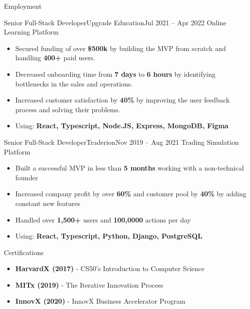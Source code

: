 \documentclass[]{mcdowellcv}
\begin{document}
\begin{cvsection}{Employment}
		\begin{cvsubsection}{Senior Full-Stack Developer}{Upgrade Education}{Jul 2021 -- Apr 2022}
			Online Learning Platform
			\begin{itemize}
				\item Secured funding of over \textbf{\$500k} by building the MVP from scratch and handling \textbf{400+} paid users.
				\item Decreased onboarding time from \textbf{7 days} to \textbf{6 hours} by identifying bottlenecks in the sales and operations.
				\item Increased customer satisfaction by \textbf{40\%} by improving the user feedback process and solving their problems.
				\item Using: \textbf{React, Typescript, Node.JS, Express, MongoDB, Figma}
			\end{itemize}
		\end{cvsubsection}

		\begin{cvsubsection}{Senior Full-Stack Developer}{Traderion}{Nov 2019 -- Aug 2021}
			Trading Simulation Platform
			\begin{itemize}
				\item Built a successful MVP in less than \textbf{5 months} working with a non-technical founder
				\item Increased company profit by over \textbf{60\%} and customer pool by \textbf{40\%} by adding constant new features
				\item Handled over \textbf{1,500+} users and \textbf{100,0000} actions per day
				\item Using: \textbf{React, Typescript, Python, Django, PostgreSQL}
			\end{itemize}
		\end{cvsubsection}
	\end{cvsection}
	
	\begin{cvsection}{Certifications}
		\begin{cvsubsection}{}{}{}	
			\begin{itemize}
				\item \textbf{HarvardX (2017)} - CS50's Introduction to Computer Science
				\item \textbf{MITx (2019)} - The Iterative Innovation Process
				\item \textbf{InnovX (2020)} - InnovX Business Accelerator Program
			\end{itemize}
		\end{cvsubsection}
	\end{cvsection}
	
\end{document}
